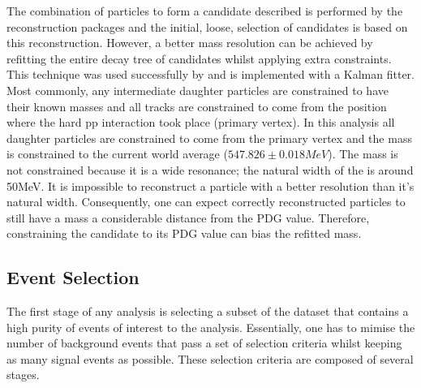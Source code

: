 The combination of particles to form a \Bd candidate described is performed by the \lhcb reconstruction packages and the initial, loose, selection of \Bd candidates is based on this reconstruction. However, a better mass resolution can be achieved by refitting the entire decay tree of \Bd candidates whilst applying extra constraints.  This technique was used successfully by \babar and is implemented with a Kalman fitter\cite{Hulsbergen:2005pu}.  Most commonly, any intermediate daughter particles are constrained to have their known masses and all tracks are constrained to come from the position where the hard pp interaction took place (primary vertex).  In this analysis all daughter particles are constrained to come from the primary vertex and the \etaz mass is constrained to the current world average ($547.826\pm0.018MeV$)\cite{PDG2014}.  The \Kstar mass is not constrained because it is a wide resonance; the natural width of the \Kstar is around 50MeV.  It is impossible to reconstruct a particle with a better resolution than it's natural width.  Consequently, one can expect correctly reconstructed \Kstar particles to still have a mass a considerable distance from the PDG value.  Therefore, constraining the \Kstar candidate to its PDG value can bias the refitted \Bd mass.

\subsection{Event Selection}
\label{sec:Selection}

The first stage of any analysis is selecting a subset of the \lhcb dataset that contains a high purity of events of interest to the analysis.  Essentially, one has to mimise the number of background events that pass a set of selection criteria whilst keeping as many signal events as possible. These selection criteria are composed of several stages.

